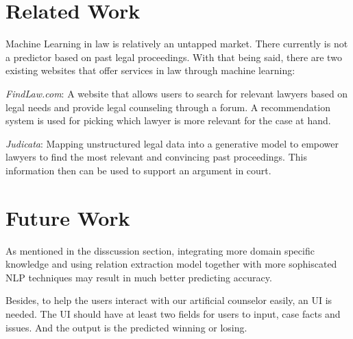 \documentclass[journal]{IEEEtran}
\begin{document}
\section{Related Work}

Machine Learning in law is relatively an untapped market. There currently is not a predictor based on past legal proceedings. With that being said, there are two existing websites that offer services in law through machine learning:

\textit{FindLaw.com}: A website that allows users to search for relevant lawyers based on legal needs and  provide legal counseling through a forum. A recommendation system is used for picking which lawyer is more relevant for the case at hand.

\textit{Judicata}: Mapping unstructured legal data into a generative model to empower lawyers to find the most relevant and convincing past proceedings. This information then can be used to support an argument in court.

\section{Future Work}

As mentioned in the disscussion section, integrating more domain specific knowledge and using relation extraction model together with more sophiscated NLP techniques may result in much better predicting accuracy.

Besides, to help the users interact with our artificial counselor easily, an UI is needed. The UI should have at least two fields for users to input, case facts and issues. And the output is the predicted winning or losing.

\end{document}
